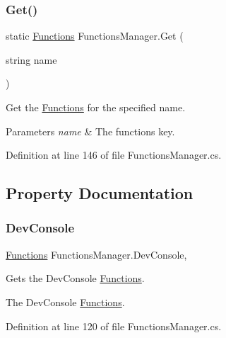 \subsubsection{\texorpdfstring{Get()}{Get()}}
{\footnotesize\ttfamily static \hyperlink{class_functions}{Functions} Functions\+Manager.\+Get (\begin{DoxyParamCaption}\item[{string}]{name }\end{DoxyParamCaption})\hspace{0.3cm}{\ttfamily [static]}}



Get the \hyperlink{class_functions}{Functions} for the specified name. 


\begin{DoxyParams}{Parameters}
{\em name} & The functions key.\\
\hline
\end{DoxyParams}


Definition at line 146 of file Functions\+Manager.\+cs.



\subsection{Property Documentation}
\mbox{\label{class_functions_manager_a8abbe32f4c541d657ba4df5acf2e8b0a}} 
\subsubsection{\texorpdfstring{Dev\+Console}{DevConsole}}
{\footnotesize\ttfamily \hyperlink{class_functions}{Functions} Functions\+Manager.\+Dev\+Console\hspace{0.3cm}{\ttfamily [static]}, {\ttfamily [get]}}



Gets the Dev\+Console \hyperlink{class_functions}{Functions}. 

The Dev\+Console \hyperlink{class_functions}{Functions}.

Definition at line 120 of file Functions\+Manager.\+cs.

\mbox{\label{class_functions_manager_aa43476bd866ef89560ae46cd7fd9d53d}} 
